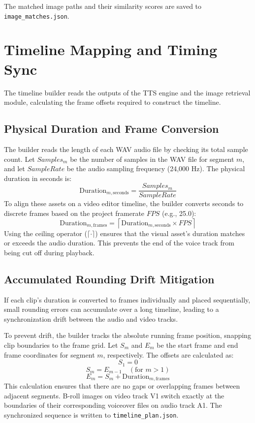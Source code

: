 \documentclass[a4paper,12pt]{report}
\begin{document}
The matched image paths and their similarity scores are saved to \texttt{image\_matches.json}.

\section{Timeline Mapping and Timing Sync}
The timeline builder reads the outputs of the TTS engine and the image retrieval module, calculating the frame offsets required to construct the timeline.

\subsection{Physical Duration and Frame Conversion}
The builder reads the length of each WAV audio file by checking its total sample count. Let $Samples_m$ be the number of samples in the WAV file for segment $m$, and let $SampleRate$ be the audio sampling frequency (24,000 Hz). The physical duration in seconds is:
\begin{equation}
    \text{Duration}_{m,\text{seconds}} = \frac{Samples_m}{SampleRate}
\end{equation}
To align these assets on a video editor timeline, the builder converts seconds to discrete frames based on the project framerate $FPS$ (e.g., 25.0):
\begin{equation}
    \text{Duration}_{m,\text{frames}} = \left\lceil \text{Duration}_{m,\text{seconds}} \times FPS \right\rceil
\end{equation}
Using the ceiling operator ($\lceil \cdot \rceil$) ensures that the visual asset's duration matches or exceeds the audio duration. This prevents the end of the voice track from being cut off during playback.

\subsection{Accumulated Rounding Drift Mitigation}
If each clip's duration is converted to frames individually and placed sequentially, small rounding errors can accumulate over a long timeline, leading to a synchronization drift between the audio and video tracks.

To prevent drift, the builder tracks the absolute running frame position, snapping clip boundaries to the frame grid. Let $S_m$ and $E_m$ be the start frame and end frame coordinates for segment $m$, respectively. The offsets are calculated as:
\begin{equation}
    S_1 = 0
\end{equation}
\begin{equation}
    S_m = E_{m-1} \quad (\text{for } m > 1)
\end{equation}
\begin{equation}
    E_m = S_m + \text{Duration}_{m,\text{frames}}
\end{equation}
This calculation ensures that there are no gaps or overlapping frames between adjacent segments. B-roll images on video track V1 switch exactly at the boundaries of their corresponding voiceover files on audio track A1. The synchronized sequence is written to \texttt{timeline\_plan.json}.
\end{document}

